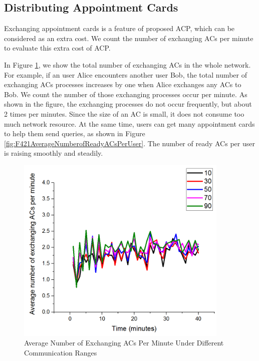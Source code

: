 \subsection{ Distributing Appointment Cards}

\noindent Exchanging appointment cards is a feature of proposed ACP, which can be considered as an extra cost. We count the number of exchanging ACs per minute to evaluate this extra cost of ACP.

In Figure \ref{fig:F422AverageNumberofExchangingACsPerMinute}, we show the total number of exchanging ACs in the whole network. For example, if an user Alice encounters another user Bob, the total number of exchanging ACs processes increases by one when Alice exchanges any ACs to Bob. We count the number of those exchanging processes occur per minute. As shown in the figure, the exchanging processes do not occur frequently, but about 2 times per minutes. Since the size of an AC is small, it does not consume too much network resource. At the same time, users can get many appointment cards to help them send queries, as shown in Figure \ref{fig:F421AverageNumberofReadyACsPerUser}. The number of ready ACs per user is raising smoothly and steadily. 

\begin{figure} [hbtp]
  \centering 
  \includegraphics[width=4.0in]{figures/F422AverageNumberofExchangingACsPerMinute.png}
  \caption{Average Number of Exchanging ACs Per Minute Under Different Communication Ranges} 
  \label{fig:F422AverageNumberofExchangingACsPerMinute} %
\end{figure}

